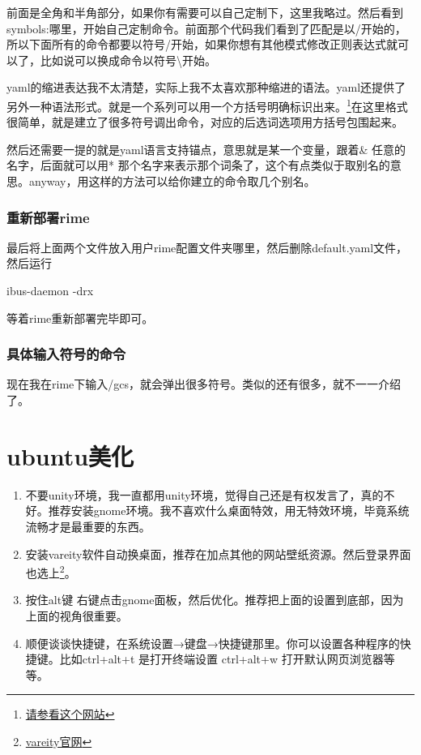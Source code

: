 \documentclass[12pt,oneside]{book}
\begin{document}
\begin{common-format}
前面是全角和半角部分，如果你有需要可以自己定制下，这里我略过。然后看到symbols:哪里，开始自己定制命令。前面那个代码我们看到了匹配是以/开始的，所以下面所有的命令都要以符号/开始，如果你想有其他模式修改正则表达式就可以了，比如说可以换成命令以符号\textbackslash 开始。

yaml的缩进表达我不太清楚，实际上我不太喜欢那种缩进的语法。yaml还提供了另外一种语法形式。就是一个系列可以用一个方括号明确标识出来。\footnote{\href{http://www.dev.idv.tw/mediawiki/index.php/YAML}{请参看这个网站}}在这里格式很简单，就是建立了很多符号调出命令，对应的后选词选项用方括号包围起来。

然后还需要一提的就是yaml语言支持锚点，意思就是某一个变量，跟着\& 任意的名字，后面就可以用* 那个名字来表示那个词条了，这个有点类似于取别名的意思。anyway，用这样的方法可以给你建立的命令取几个别名。

\subsubsection{重新部署rime}
最后将上面两个文件放入用户rime配置文件夹哪里，然后删除default.yaml文件，然后运行
\begin{tcbbash}[]
ibus-daemon   -drx
\end{tcbbash}
等着rime重新部署完毕即可。

\subsubsection{具体输入符号的命令}
现在我在rime下输入/gcs，就会弹出很多符号。类似的还有很多，就不一一介绍了。


\section{ubuntu美化}
\begin{enumerate}
\item 不要unity环境，我一直都用unity环境，觉得自己还是有权发言了，真的不好。推荐安装gnome环境。我不喜欢什么桌面特效，用无特效环境，毕竟系统流畅才是最重要的东西。
\item 安装vareity软件自动换桌面，推荐在加点其他的网站壁纸资源。然后登录界面也选上\footnote{\href{http://peterlevi.com/variety/}{vareity官网}}。
\item 按住alt键 右键点击gnome面板，然后优化。推荐把上面的设置到底部，因为上面的视角很重要。
\item 顺便谈谈快捷键，在系统设置→键盘→快捷键那里。你可以设置各种程序的快捷键。比如ctrl+alt+t 是打开终端设置 ctrl+alt+w 打开默认网页浏览器等等。
\end{enumerate}


\end{common-format}
\end{document}
